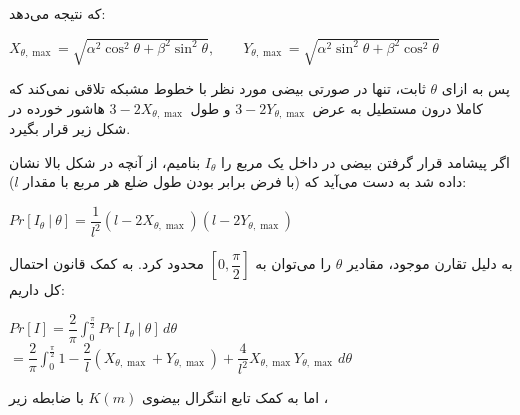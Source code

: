 \documentclass{scribe-cgenomics}
\begin{document}
\begin{حل}
که نتیجه می‌دهد:

\begin{center}
$
X_{\theta, \max} = \sqrt{\alpha^2 \cos^2 \theta + \beta^2\sin^2 \theta}, \qquad
Y_{\theta, \max} = \sqrt{\alpha^2 \sin^2 \theta + \beta^2\cos^2 \theta}
$
\end{center}

پس به ازای
$\theta$
ثابت، تنها در صورتی بیضی مورد نظر با خطوط مشبکه تلاقی نمی‌کند که کاملا درون مستطیل به عرض
$3-2Y_{\theta, \max}$
و
طول
$3-2X_{\theta, \max}$
هاشور خورده در شکل زیر قرار بگیرد.

\bigbreak

\begin{figure}[h]
\centering
\end{figure}

اگر پیشامد قرار گرفتن بیضی در داخل یک مربع را
$I_{\theta}$
بنامیم، از آنچه در شکل بالا نشان داده شد به دست می‌آید که (با فرض برابر بودن طول ضلع هر مربع با مقدار
$l$):

\begin{center}
$
Pr[I_{\theta}\ |\ \theta] = \dfrac{1}{l^2} (l-2 X_{\theta, \max}) (l- 2Y_{\theta, \max})
$
\end{center}

به دلیل تقارن موجود، مقادیر
$\theta$
را می‌توان به
$[0, \dfrac{\pi}{2}]$
محدود کرد. به کمک قانون احتمال کل داریم:

\begin{center}
$
Pr[I] = \dfrac{2}{\pi}\int_{0}^{\frac{\pi}{2}} Pr[I_{\theta}\ |\ \theta]\, d\theta
$
\bigbreak
$
= \dfrac{2}{\pi} \int_{0}^{\frac{\pi}{2}} 1 - \dfrac{2}{l} (X_{\theta, \max} + Y_{\theta, \max}) + \dfrac{4}{l^2} X_{\theta, \max} Y_{\theta, \max} \, d\theta
$
\end{center}

اما به کمک تابع انتگرال بیضوی
$K(m)$
با ضابطه زیر
\cite{ellipk}،


\end{حل}
\end{document}

